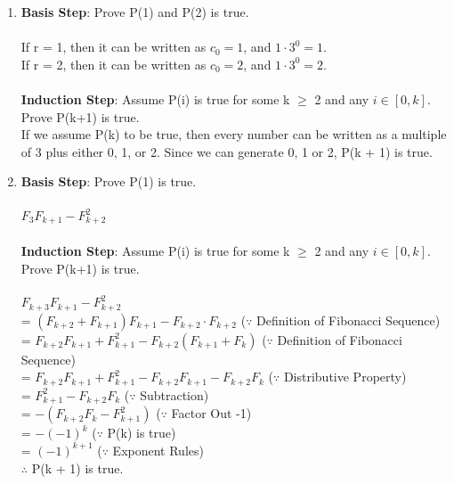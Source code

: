 \documentclass[12pt]{article}
\begin{document}
\begin{enumerate}[label = (\alph*)]
    \item 
        
        \textbf{Basis Step}: Prove P(1) and P(2) is true.\\
        \\
        If r = 1, then it can be written as $c_0 = 1$, and $1 \cdot 3^0 = 1$. \\
        If r = 2, then it can be written as $c_0 = 2$, and $1 \cdot 3^0 = 2$. \\
        \\
        \textbf{Induction Step}: Assume P(i) is true for some k $\geq$ 2 and any 
        $i \in [0, k]$. Prove P(k+1) is true.
        \\
        If we assume P(k) to be true, then every number can be written as a multiple of 3 plus either 0,
        1, or 2. Since we can generate 0, 1 or 2, P(k + 1) is true.

    \item 
            
        \textbf{Basis Step}: Prove P(1) is true.\\
        \\
        $F_{3}F_{k+1} - F_{k+2}^2$ \\
        \\
        \textbf{Induction Step}: Assume P(i) is true for some k $\geq$ 2 and any 
        $i \in [0, k]$. Prove P(k+1) is true. \\
        \\
        $F_{k+3}F_{k+1} - F_{k+2}^2$ \\
        = $(F_{k+2}+F_{k+1})F_{k+1} - F_{k+2} \cdot F_{k+2}$ \hspace{3em} ($\because$ Definition of Fibonacci
            Sequence) \\
        = $F_{k+2}F_{k+1} + F_{k+1}^2 - F_{k+2}(F_{k+1}+F_{k})$ \hspace{3em} ($\because$ Definition of Fibonacci
            Sequence) \\
        = $F_{k+2}F_{k+1} + F_{k+1}^2 - F_{k+2}F_{k+1} - F_{k+2}F_{k}$ \hspace{3em} ($\because$ Distributive Property) \\
        = $F_{k+1}^2 - F_{k+2}F_{k}$ \hspace{3em} ($\because$ Subtraction) \\
        = $-(F_{k+2}F_{k} - F_{k+1}^2)$ \hspace{3em} ($\because$ Factor Out -1) \\
        = $-(-1)^k$ \hspace{3em} ($\because$ P(k) is true) \\
        = $(-1)^{k+1}$ \hspace{3em} ($\because$ Exponent Rules) \\
        $\therefore$ P(k + 1) is true.


\end{enumerate}
\end{document}
